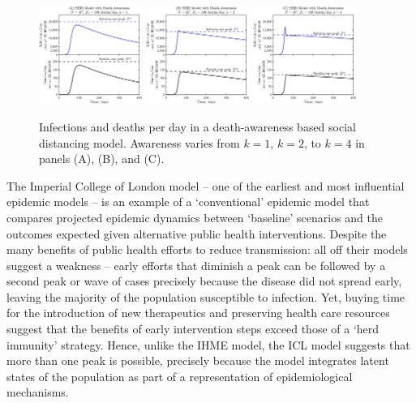 \begin{figure}[t!]
\begin{center}
\includegraphics[width=0.3\textwidth]{figseir_baseplat_a1_noname.pdf}
\includegraphics[width=0.3\textwidth]{figseir_baseplat_a2_noname.pdf}
\includegraphics[width=0.3\textwidth]{figseir_baseplat_a4_noname.pdf}
\caption{Infections and deaths per day in a death-awareness based
social distancing model. Awareness varies from $k=1$, $k=2$, to $k=4$ 
in panels (A), (B), and (C).
\label{fig.ID_day}}
\end{center}
\end{figure}

The Imperial College of London model -- one of the earliest and most influential epidemic models -- is an example of a `conventional' epidemic model
that compares projected epidemic dynamics
between `baseline' scenarios and the outcomes expected
given alternative public health interventions. Despite the many
benefits of public health efforts to reduce transmission: all off their
models suggest a weakness -- early efforts that diminish a peak can be
followed by a second peak or wave of cases precisely because
the disease did not spread early, leaving the majority of the population
susceptible to infection. Yet, buying time for the introduction
of new therapeutics and preserving health care resources suggest
that the benefits of  early intervention steps exceed those of
a `herd immunity' strategy.  Hence, unlike the IHME model,
the ICL model suggests that more than one peak is possible,
precisely because the model integrates latent states of the population
as part of a representation of epidemiological mechanisms.

